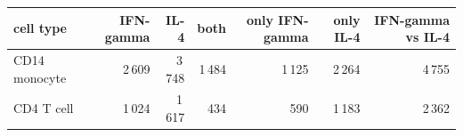 \begin{tabular}{@{}lrrrrrr@{}}\toprule
cell type & IFN-gamma & IL-4 & both & only IFN-gamma & only IL-4 & IFN-gamma vs IL-4\\\midrule
CD14 monocyte & 2\,609 & 3\,748 & 1\,484 & 1\,125 & 2\,264 & 4\,755\\
CD4 T cell & 1\,024 & 1\,617 & 434 & 590 & 1\,183 & 2\,362\\
\bottomrule\end{tabular}
